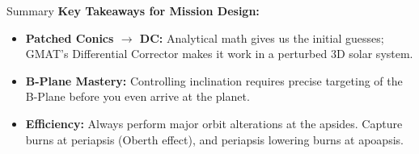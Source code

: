 \documentclass[11pt]{beamer}
\begin{document}
\begin{frame}{Summary}
    \textbf{Key Takeaways for Mission Design:}
    \begin{itemize}
        \item \textbf{Patched Conics $\rightarrow$ DC:} Analytical math gives us the initial guesses; GMAT's Differential Corrector makes it work in a perturbed 3D solar system.
        \item \textbf{B-Plane Mastery:} Controlling inclination requires precise targeting of the B-Plane before you even arrive at the planet.
        \item \textbf{Efficiency:} Always perform major orbit alterations at the apsides. Capture burns at periapsis (Oberth effect), and periapsis lowering burns at apoapsis.
    \end{itemize}
\end{frame}
\end{document}
